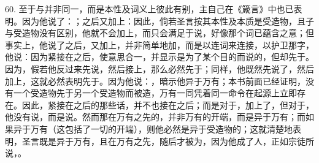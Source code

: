 60. 至于与并非同一，而是本性及词义上彼此有别，主自己在《箴言》中也已表明。因为他说了：；之后又加上：因此，倘若圣言按其本性及本质是受造物，且子与受造物没有区别，他就不会加上，而只会满足于说，好像那个词已蕴含之意；但事实上，他说了之后，又加上，并非简单地加，而是以连词来连接，以护卫那字，他说：因为紧接在之后，使意思合一，并显示是为了某个目的而说的，但却先于。因为，假若他反过来先说，然后接上，那么必然先于；同样，他既然先说了，然后加上，这就必然表明先于。因为他说：，暗示他异于万有；本书前面已经证明，没有一个受造物先于另一个受造物而被造，万有一同凭着同一命令在起源上立即存在。因此，紧接在之后的那些话，并不也接在之后；而是对于，加上了，但对于，他没有说，而是说。然而那在万有之先的，并非万有的开端，而是异于万有；而如果异于万有（这包括了一切的开端），则他必然是异于受造物的；这就清楚地表明，圣言既是异于万有，且在万有之先，随后才被为，因为他成了人，正如宗徒所说，。\par

